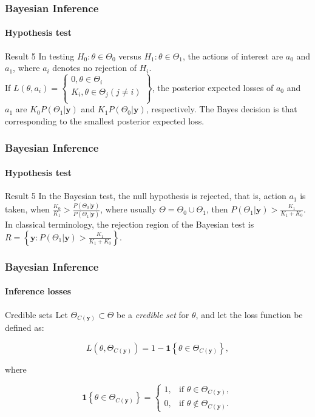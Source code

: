 \documentclass[12pt, compress]{beamer}
\begin{document}
\begin{frame}
	\frametitle{Bayesian Inference}
	\framesubtitle{Hypothesis test}
	\begin{block}{Result 5}
		In testing $H_0:\theta\in\Theta_0$ versus $H_1:\theta\in\Theta_1$, the actions of interest are $a_0$ and $a_1$, where $a_i$ denotes no rejection of $H_i$.\\
		
		If $L(\theta,a_i)=\begin{Bmatrix}
		0, \theta\in \Theta_i\\
		K_i, \theta\in\Theta_j(j\neq i)\\
		\end{Bmatrix}$, the posterior expected losses of $a_0$ and $a_1$ are $K_0P(\Theta_1|\boldsymbol{y})$ and $K_1P(\Theta_0|\boldsymbol{y})$, respectively. The Bayes decision is that corresponding to the smallest posterior expected loss. 
	\end{block}
\end{frame}

\begin{frame}
	\frametitle{Bayesian Inference}
	\framesubtitle{Hypothesis test}
	\begin{block}{Result 5}
		In the Bayesian test, the null hypothesis is rejected, that is, action $a_1$ is taken, when $\frac{K_0}{K_1}>\frac{P(\Theta_0|\boldsymbol{y})}{P(\Theta_1|\boldsymbol{y})}$, where usually $\Theta=\Theta_0 \cup \Theta_1$, then $P(\Theta_1|\boldsymbol{y})>\frac{K_1}{K_1+K_0}$.\\
		
		In classical terminology, the rejection region of the Bayesian test is $R=\left\{\boldsymbol{y}:P(\Theta_1|\boldsymbol{y})>\frac{K_1}{K_1+K_0} \right\}$. 
	\end{block}
\end{frame}

\begin{frame}
	\frametitle{Bayesian Inference}
	\framesubtitle{Inference losses}
	\begin{block}{Credible sets}
		Let $\Theta_{C(\mathbf{y})} \subset \Theta$ be a \textit{credible set} for $\theta$, and let the loss function be defined as:
		
		\[
		L(\theta, \Theta_{C(\mathbf{y})}) = 1 - \mathbf{1}\left\{\theta \in \Theta_{C(\mathbf{y})}\right\},
		\]
		
		where
		
		\[
		\mathbf{1}\left\{\theta \in \Theta_{C(\mathbf{y})}\right\} =
		\begin{cases}
			1, & \text{if } \theta \in \Theta_{C(\mathbf{y})}, \\
			0, & \text{if } \theta \notin \Theta_{C(\mathbf{y})}.
		\end{cases}
		\]
	\end{block}

\end{frame}
\end{document}
